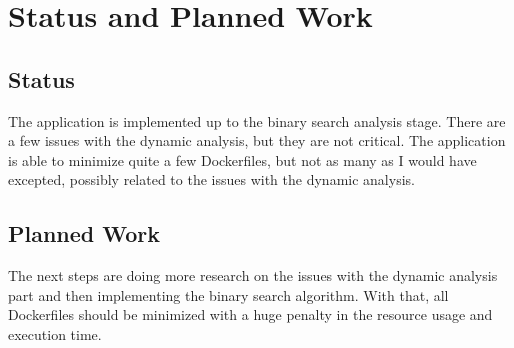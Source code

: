 \chapter{Status and Planned Work}
\label{chapter:status-planned-work}

\section{Status}
\label{sec:status}

The application is implemented up to the binary search analysis stage. There are a few
issues with the dynamic analysis, but they are not critical. The application is able
to minimize quite a few Dockerfiles, but not as many as I would have excepted, possibly
related to the issues with the dynamic analysis.

\section{Planned Work}
\label{sec:planned-work}

The next steps are doing more research on the issues with the dynamic analysis part and then 
implementing the binary search algorithm. With that, all Dockerfiles should be minimized with a 
huge penalty in the resource usage and execution time.